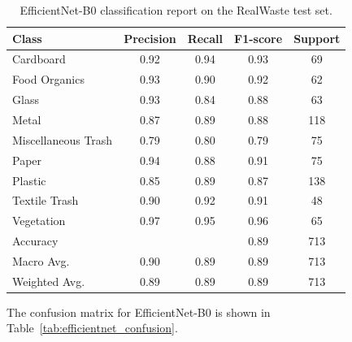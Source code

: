 \documentclass[12pt,a4paper]{article}
\begin{document}
\begin{table}[H]
    \centering
    \caption{EfficientNet-B0 classification report on the RealWaste test set.}
    \label{tab:efficientnet_classification}
    \begin{tabular}{lcccc}
        \hline
        Class & Precision & Recall & F1-score & Support \\
        \hline
        Cardboard & 0.92 & 0.94 & 0.93 & 69 \\
        Food Organics & 0.93 & 0.90 & 0.92 & 62 \\
        Glass & 0.93 & 0.84 & 0.88 & 63 \\
        Metal & 0.87 & 0.89 & 0.88 & 118 \\
        Miscellaneous Trash & 0.79 & 0.80 & 0.79 & 75 \\
        Paper & 0.94 & 0.88 & 0.91 & 75 \\
        Plastic & 0.85 & 0.89 & 0.87 & 138 \\
        Textile Trash & 0.90 & 0.92 & 0.91 & 48 \\
        Vegetation & 0.97 & 0.95 & 0.96 & 65 \\
        \hline
        Accuracy & & & 0.89 & 713 \\
        Macro Avg. & 0.90 & 0.89 & 0.89 & 713 \\
        Weighted Avg. & 0.89 & 0.89 & 0.89 & 713 \\
        \hline
    \end{tabular}
\end{table}

The confusion matrix for EfficientNet-B0 is shown in Table~\ref{tab:efficientnet_confusion}. 

\begin{table}[H]
    \centering
    \caption{EfficientNet-B0 confusion matrix on the RealWaste test set.}
    \label{tab:efficientnet_confusion}
\end{table}
\end{document}

